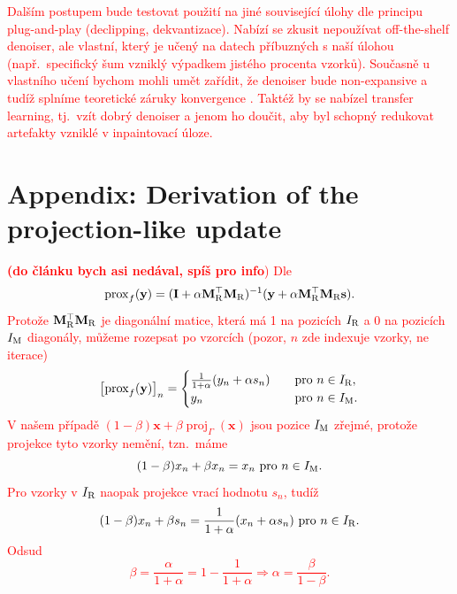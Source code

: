 \documentclass[conference]{IEEEtran}
\newcommand{\todo}[1]{\textcolor{red}{#1}}
\begin{document}
\todo{Dalším postupem bude testovat použití na jiné související úlohy dle principu plug-and-play (declipping, dekvantizace). Nabízí se zkusit nepoužívat off-the-shelf denoiser, ale vlastní, který je učený na datech příbuzných s naší úlohou (např.\ specifický šum vzniklý výpadkem jistého procenta vzorků). Současně u vlastního učení bychom mohli umět zařídit, že denoiser bude non-expansive a tudíž splníme teoretické záruky konvergence \cite{Venkatakrishnan2013,Chan2016}. Taktéž by se nabízel transfer learning, tj.\ vzít dobrý denoiser a jenom ho doučit, aby byl schopný redukovat artefakty vzniklé v inpaintovací úloze.}

\section*{Appendix: Derivation of the projection-like update}

\noindent
\todo{\textbf{(do článku bych asi nedával, spíš pro info})}
\todo{%
	Dle \cite[Tab.\,1]{Combettes2011}
	\begin{equation}
		\operatorname{prox}_f(\mathbf{y}) = (\mathbf{I} + \alpha \mathbf{M}_{\textup{R}}^\top\mathbf{M}_{\textup{R}})^{-1}(\mathbf{y} + \alpha\mathbf{M}_{\textup{R}}^\top\mathbf{M}_{\textup{R}}\mathbf{s}).
	\end{equation}
	Protože $\mathbf{M}_{\textup{R}}^\top\mathbf{M}_{\textup{R}}$ je diagonální matice, která má 1 na pozicích $I_\textup{R}$ a 0 na pozicích $I_\textup{M}$ diagonály, můžeme rozepsat po vzorcích (pozor, $n$ zde indexuje vzorky, ne iterace)
	\begin{equation}
		\left[\operatorname{prox}_f(\mathbf{y})\right]_n = \begin{cases}
			\frac{1}{1+\alpha}(y_n + \alpha s_n) \quad &\text{pro } n\in I_\textup{R}, \\
			y_n\quad &\text{pro } n\in I_\textup{M}. 
		\end{cases}
	\end{equation}
	V našem případě $(1-\beta)\mathbf{x} + \beta \operatorname{proj}_{\Gamma}(\mathbf{x})$ jsou pozice $I_\textup{M}$ zřejmé, protože projekce tyto vzorky nemění, tzn.\ máme
	\begin{equation}
		(1-\beta) x_n + \beta x_n = x_n \text{ pro } n\in I_\textup{M}.
	\end{equation}
	Pro vzorky v $I_\textup{R}$ naopak projekce vrací hodnotu $s_n$, tudíž
	\begin{equation}
		(1-\beta) x_n + \beta s_n = \frac{1}{1+\alpha}(x_n + \alpha s_n)\text{ pro } n\in I_\textup{R}.
	\end{equation}
	Odsud
	\begin{equation}
		\beta = \frac{\alpha}{1+\alpha} = 1 - \frac{1}{1+\alpha} \Longrightarrow \alpha = \frac{\beta}{1-\beta}.
	\end{equation}
}
\end{document}
